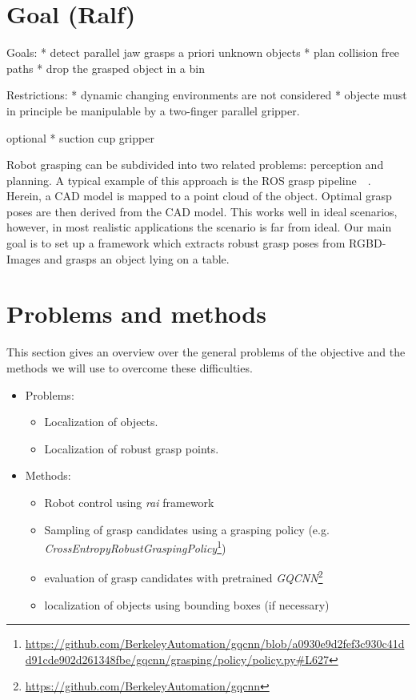 \documentclass[a4paper]{article}
\begin{document}
\section{Goal (Ralf)} 
\label{2sec_goal}

Goals:
* detect parallel jaw grasps a priori unknown objects
* plan collision free paths 
* drop the grasped object in a bin

Restrictions:
* dynamic changing environments are not considered
* objecte must in principle be manipulable by a two-finger parallel gripper.

optional
* suction cup gripper

Robot grasping can be subdivided into two related problems: perception and planning.
A typical example of this approach is the ROS grasp pipeline~~\cite{chitta_perception_2012}.
Herein, a CAD model is mapped to a point cloud of the object.
Optimal grasp poses are then derived from the CAD model. 
This works well in ideal scenarios, however, in most realistic applications the scenario is far from ideal.
Our main goal is to set up a framework which extracts robust grasp poses from RGBD-Images and grasps an object lying on a table.

\section{Problems and methods}
\label{3sec_prob_n_meth}
This section gives an overview over the general problems of the objective and the methods we will use to overcome these difficulties.

\begin{itemize}
    \item Problems:\\
    \begin{itemize}
        \item Localization of objects.
        \item Localization of robust grasp points.
    \end{itemize}
    \item Methods:\\
    \begin{itemize}
        \item Robot control using \textit{rai} framework
        \item Sampling of grasp candidates using a grasping policy (e.g. \textit{CrossEntropyRobustGraspingPolicy}\footnote{\url{https://github.com/BerkeleyAutomation/gqcnn/blob/a0930e9d2fef3c930c41dd91cde902d261348fbe/gqcnn/grasping/policy/policy.py#L627}}) 
        \item evaluation of grasp candidates with pretrained \textit{GQCNN}\footnote{\url{https://github.com/BerkeleyAutomation/gqcnn}}
        \item localization of objects using bounding boxes (if necessary)
    \end{itemize}
\end{itemize}
\end{document}
